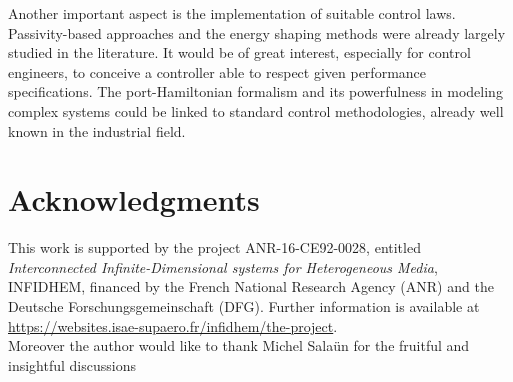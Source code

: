 \documentclass[preprint,12pt]{elsarticle}
\begin{document}
Another important aspect is the implementation of suitable control laws. Passivity-based approaches and the energy shaping methods were already largely studied in the literature. It would be of great interest, especially for control engineers, to conceive a controller able to respect given performance specifications. The port-Hamiltonian formalism and its powerfulness in modeling complex systems could be linked to standard control methodologies, already well known in the industrial field.   

\section*{Acknowledgments}
This work is  supported by the project ANR-16-CE92-0028,
entitled {\em Interconnected Infinite-Dimensional systems for Heterogeneous
Media}, INFIDHEM, financed by the French National
Research Agency (ANR) and the Deutsche Forschungsgemeinschaft (DFG).
Further information is available at {\url{https://websites.isae-supaero.fr/infidhem/the-project}}.  \\
Moreover the author would like to thank Michel Sala\"un for the fruitful and insightful discussions
   


	
	
\end{document}
